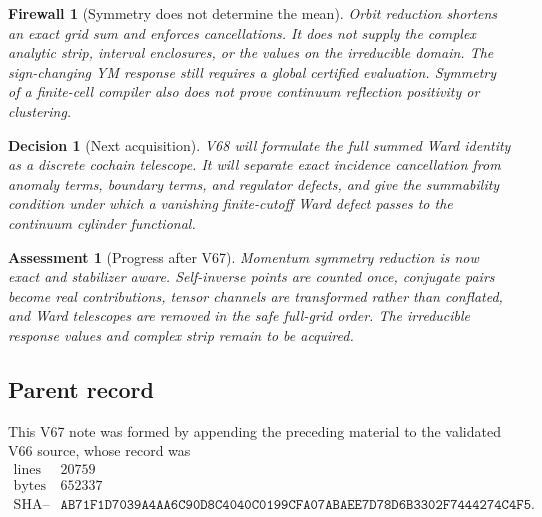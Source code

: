 \documentclass[11pt]{article}
\newtheorem{assessment}[theorem]{Assessment}
\newtheorem{firewall}[theorem]{Firewall}
\newtheorem{decision}[theorem]{Decision}
\begin{document}
\begin{firewall}[Symmetry does not determine the mean]
\label{fire:v11v67-boundary}
Orbit reduction shortens an exact grid sum and enforces cancellations.
It does not supply the complex analytic strip, interval enclosures, or
the values on the irreducible domain.  The sign-changing YM response
still requires a global certified evaluation.  Symmetry of a
finite-cell compiler also does not prove continuum reflection
positivity or clustering.
\end{firewall}

\begin{decision}[Next acquisition]
\label{dec:v11v67-next}
V68 will formulate the full summed Ward identity as a discrete
cochain telescope.  It will separate exact incidence cancellation from
anomaly terms, boundary terms, and regulator defects, and give the
summability condition under which a vanishing finite-cutoff Ward defect
passes to the continuum cylinder functional.
\end{decision}

\begin{assessment}[Progress after V67]
\label{ass:v11v67-status}
Momentum symmetry reduction is now exact and stabilizer aware.
Self-inverse points are counted once, conjugate pairs become real
contributions, tensor channels are transformed rather than conflated,
and Ward telescopes are removed in the safe full-grid order.  The
irreducible response values and complex strip remain to be acquired.
\end{assessment}

\subsection{Parent record}

This V67 note was formed by appending the preceding material to the
validated V66 source, whose record was
\[
\begin{array}{c|c}
\text{lines}&20759\\
\text{bytes}&652337\\
\text{SHA--256}&
\texttt{AB71F1D7039A4AA6C90D8C4040C0199CFA07ABAEE7D78D6B3302F7444274C4F5}.
\end{array}                                                     \tag{67.11}
\]

\end{document}

